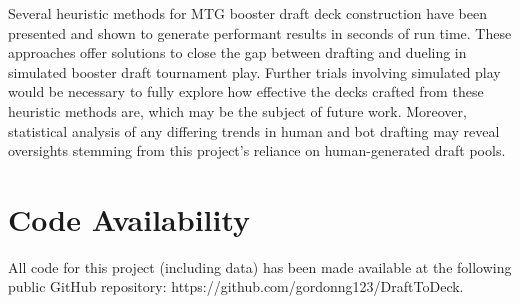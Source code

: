 \documentclass[letterpaper]{article} %
\begin{document}
Several heuristic methods for MTG booster draft deck construction have been presented and shown to generate performant results in seconds of run time. These approaches offer solutions to close the gap between drafting and dueling in simulated booster draft tournament play. Further trials involving simulated play would be necessary to fully explore how effective the decks crafted from these heuristic methods are, which may be the subject of future work. Moreover, statistical analysis of any differing trends in human and bot drafting may reveal oversights stemming from this project's reliance on human-generated draft pools.

\section{Code Availability}

All code for this project (including data) has been made available at the following public GitHub repository: https://github.com/gordonng123/DraftToDeck.


\end{document}
